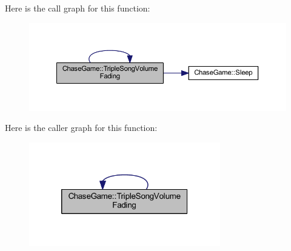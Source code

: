 Here is the call graph for this function\-:
\nopagebreak
\begin{figure}[H]
\begin{center}
\leavevmode
\includegraphics[width=350pt]{namespace_chase_game_a3b9e1d486d981f5332d23142eb4777b7_cgraph}
\end{center}
\end{figure}




Here is the caller graph for this function\-:
\nopagebreak
\begin{figure}[H]
\begin{center}
\leavevmode
\includegraphics[width=236pt]{namespace_chase_game_a3b9e1d486d981f5332d23142eb4777b7_icgraph}
\end{center}
\end{figure}


